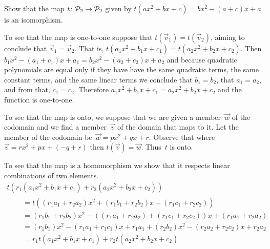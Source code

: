 \documentclass[11pt]{examjh}
\begin{document}
\begin{questions}

\question
Show that the map $\mbox{$t\colon \mathcal{P}_2\to \mathcal{P}_2$}$ given by
$t(ax^2+bx+c)=bx^2-(a+c)x+a$ is an isomorphism.
\begin{solution}[2.5in]
To see that the map is one-to-one suppose that $t(\vec{v}_1)=t(\vec{v}_2)$,
aiming to conclude that $\vec{v}_1=\vec{v}_2$.
That is, $t(a_1x^2+b_1x+c_1)=t(a_2x^2+b_2x+c_2)$.
Then $b_1x^2-(a_1+c_1)x+a_1=b_2x^2-(a_2+c_2)x+a_2$ and because 
quadratic polynomials
are equal only if they have have the same quadratic terms, the same constant
terms, and the same linear terms we conclude that 
$b_1=b_2$, that $a_1=a_2$, and from that, $c_1=c_2$.
Therefore $a_1x^2+b_1x+c_1=a_2x^2+b_2x+c_2$ and the function is 
one-to-one.

To see that the map is onto, we suppose that we are given a member~$\vec{w}$ 
of the codomain and we find a member~$\vec{v}$ of the domain that maps to
it.
Let the member of the codomain be~$\vec{w}=px^2+qx+r$.
Observe that where $\vec{v}=rx^2+px+(-q+r)$ then $t(\vec{v})=\vec{w}$.
Thus~$t$ is onto.  

To see that the map is a homomorphism we show that it respects linear 
combinations of two elements.
\begin{multline*}
  t(r_1(a_1x^2+b_1x+c_1)+r_2(a_2x^2+b_2x+c_2))              \\ 
  \begin{split} \quad 
  &=t((r_1a_1+r_2a_2)x^2+(r_1b_1+r_2b_2)x+(r_1c_1+r_2c_2))   \\
  &=(r_1b_1+r_2b_2)x^2-((r_1a_1+r_2a_2)+(r_1c_1+r_2c_2))x+(r_1a_1+r_2a_2)  \\
  &=(r_1b_1)x^2-(r_1a_1+r_1c_1)x+r_1a_1
     +(r_2b_2)x^2-(r_2a_2+r_2c_2)x+r_2a_2                       \\
  &=r_1t(a_1x^2+b_1x+c_1)+r_2t(a_2x^2+b_2x+c_2)
  \end{split}
\end{multline*}
\end{solution}




\end{questions}
\end{document}
